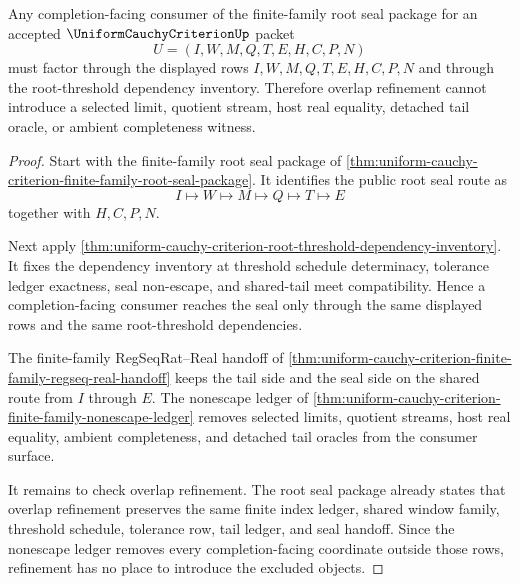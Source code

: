 \begin{theorem}
\label{thm:uniform-cauchy-criterion-finite-family-root-seal-pullback-nonescape}
Any completion-facing consumer of the finite-family root seal package for an accepted $\UniformCauchyCriterionUp$ packet
$$
U=(I,W,M,Q,T,E,H,C,P,N)
$$
must factor through the displayed rows $I,W,M,Q,T,E,H,C,P,N$ and through the root-threshold dependency inventory. Therefore overlap refinement cannot introduce a selected limit, quotient stream, host real equality, detached tail oracle, or ambient completeness witness.
\end{theorem}
\begin{proof}
Start with the finite-family root seal package of \autoref{thm:uniform-cauchy-criterion-finite-family-root-seal-package}. It identifies the public root seal route as
$$
I \longmapsto W \longmapsto M \longmapsto Q \longmapsto T \longmapsto E
$$
together with $H,C,P,N$.

Next apply \autoref{thm:uniform-cauchy-criterion-root-threshold-dependency-inventory}. It fixes the dependency inventory at threshold schedule determinacy, tolerance ledger exactness, seal non-escape, and shared-tail meet compatibility. Hence a completion-facing consumer reaches the seal only through the same displayed rows and the same root-threshold dependencies.

The finite-family RegSeqRat--Real handoff of \autoref{thm:uniform-cauchy-criterion-finite-family-regseq-real-handoff} keeps the tail side and the seal side on the shared route from $I$ through $E$. The nonescape ledger of \autoref{thm:uniform-cauchy-criterion-finite-family-nonescape-ledger} removes selected limits, quotient streams, host real equality, ambient completeness, and detached tail oracles from the consumer surface.

It remains to check overlap refinement. The root seal package already states that overlap refinement preserves the same finite index ledger, shared window family, threshold schedule, tolerance row, tail ledger, and seal handoff. Since the nonescape ledger removes every completion-facing coordinate outside those rows, refinement has no place to introduce the excluded objects.
\end{proof}

